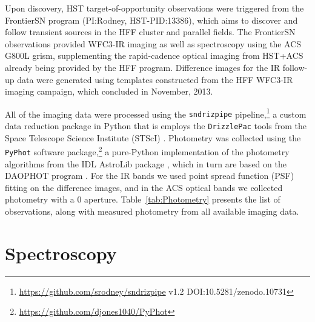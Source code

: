 Upon discovery, HST target-of-opportunity observations were triggered
from the FrontierSN program (PI:Rodney, HST-PID:13386), which aims to
discover and follow transient sources in the HFF cluster and parallel
fields. The FrontierSN observations provided WFC3-IR imaging as well
as spectroscopy using the ACS G800L grism, supplementing the
rapid-cadence optical imaging from HST+ACS already being provided by
the HFF program. Difference images for the IR follow-up data were
generated using templates constructed from the HFF WFC3-IR imaging
campaign, which concluded in November, 2013.

All of the imaging data were processed using the {\tt sndrizpipe}
pipeline,\footnote{\url{https://github.com/srodney/sndrizpipe} v1.2
DOI:10.5281/zenodo.10731} a custom data reduction package in Python
that is employs the {\tt DrizzlePac} tools from the Space Telescope
Science Institute (STScI) \citep{Fruchter:2010}.  Photometry was
collected using the {\tt PyPhot} software
package,\footnote{\url{https://github.com/djones1040/PyPhot}} a
pure-Python implementation of the photometry algorithms from the IDL
AstroLib package \citep{Landsman:1993}, which in turn are based on the
DAOPHOT program \citep{Stetson:1987}.  For the IR bands we used point
spread function (PSF) fitting on the difference images, and in the ACS
optical bands we collected photometry with a
0 aperture. Table~\ref{tab:Photometry} presents the list of
observations, along with measured photometry from all available
imaging data.
 


\section{Spectroscopy}
\label{sec:Spectroscopy}

